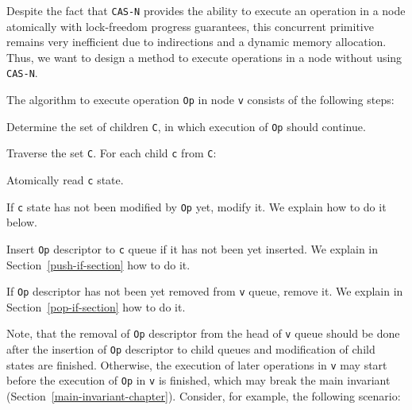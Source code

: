 \documentclass[times, dvipsnames,%
               languages={russian,english} %
              ]{itmo-student-thesis}
\begin{document}
Despite the fact that \texttt{CAS-N} provides the ability to execute an operation in a node atomically with lock-freedom progress guarantees, this concurrent primitive remains very inefficient due to indirections and a dynamic memory allocation. Thus, we want to design a method to execute operations in a node without using \texttt{CAS-N}.

The algorithm to execute operation \texttt{Op} in node \texttt{v} consists of the following steps:

\begin{nenum}
    \item Determine the set of children \texttt{C}, in which execution of \texttt{Op} should continue.
    
    \item Traverse the set \texttt{C}. For each child \texttt{c} from \texttt{C}:
        \begin{nenum}
            \item Atomically read \texttt{c} state.
            
            \item If \texttt{c} state has not been modified by \texttt{Op} yet, modify it. We explain how to do it below.
            
            \item Insert \texttt{Op} descriptor to \texttt{c} queue if it has not been yet inserted. We explain in Section~\ref{push-if-section} how to do it.
        \end{nenum}
    
    \item If \texttt{Op} descriptor has not been yet removed from \texttt{v} queue, remove it. We explain in Section~\ref{pop-if-section} how to do it.
\end{nenum}

\bigbreak

Note, that the removal of \texttt{Op} descriptor from the head of \texttt{v} queue should be done after the insertion of \texttt{Op} descriptor to child queues and modification of child states are finished. Otherwise, the execution of later operations in \texttt{v} may start before the execution of \texttt{Op} in \texttt{v} is finished, which may break the main invariant (Section~\ref{main-invariant-chapter}). Consider, for example, the following scenario:
\end{document}
